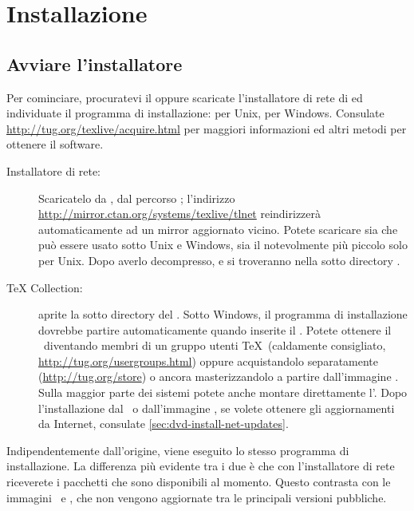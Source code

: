 \documentclass{article}
\begin{document}
\section{Installazione}
\label{sec:install}

\subsection{Avviare l'installatore}
\label{sec:inst-start}

Per cominciare, procuratevi il \DVD{} \TK{} oppure scaricate
l'installatore di rete di \TL{} ed individuate il programma di
installazione:  per Unix, 
per Windows. Consulate \url{http://tug.org/texlive/acquire.html} per
maggiori informazioni ed altri metodi per ottenere il software.

\begin{description}
\item [Installatore di rete:] Scaricatelo da \CTAN, dal percorso
; l'indirizzo
\url{http://mirror.ctan.org/systems/texlive/tlnet} reindirizzerà
automaticamente ad un mirror aggiornato vicino. Potete scaricare sia
 che può essere usato sotto Unix e Windows, sia
il notevolmente più piccolo  solo per Unix.
Dopo averlo decompresso,  e 
si troveranno nella sotto directory .

\item [\DVD{} \TeX{} Collection:] aprite la sotto directory
 del \DVD. Sotto Windows, il programma di installazione
dovrebbe partire automaticamente quando inserite il \DVD. Potete ottenere il
\DVD\ diventando membri di un gruppo utenti \TeX\ (caldamente consigliato,
\url{http://tug.org/usergroups.html}) oppure acquistandolo separatamente
(\url{http://tug.org/store}) o ancora masterizzandolo a partire
dall'immagine \ISO. Sulla maggior parte dei sistemi potete anche montare
direttamente l'\ISO. Dopo l'installazione dal \DVD\ o dall'immagine \ISO, se
volete ottenere gli aggiornamenti da Internet, consulate
\ref{sec:dvd-install-net-updates}.

\end{description}

Indipendentemente dall'origine, viene eseguito lo stesso programma di
installazione. La differenza più evidente tra i due è che con l'installatore
di rete riceverete i pacchetti che sono disponibili al momento. Questo
contrasta con le immagini \DVD\ e \ISO, che non vengono aggiornate tra le
principali versioni pubbliche.
\end{document}
